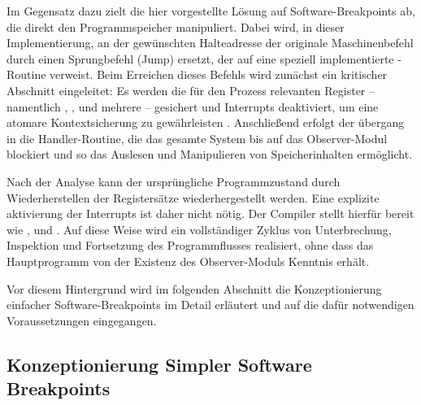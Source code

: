 Im Gegensatz dazu zielt die hier vorgestellte L\"osung auf Software-Breakpoints ab, die direkt den Programmspeicher manipuliert. Dabei wird, in dieser Implementierung, an der gew\"unschten Halteadresse der originale Maschinenbefehl durch einen Sprungbefehl (Jump) ersetzt, der auf eine speziell implementierte -Routine verweist. Beim Erreichen dieses Befehls wird zun\"achst ein kritischer Abschnitt eingeleitet: Es werden die f\"ur den Prozess relevanten Register – namentlich , ,  und \ggf mehrere  – gesichert und Interrupts deaktiviert, um eine atomare Kontextsicherung zu gew\"ahrleisten . Anschlie{\ss}end erfolgt der \"ubergang in die Handler-Routine, die das gesamte System bis auf das Observer-Modul blockiert und so das Auslesen und Manipulieren von Speicherinhalten erm\"oglicht.

Nach der Analyse kann der urspr\"ungliche Programmzustand durch Wiederherstellen der Registers\"atze wiederhergestellt werden. Eine explizite aktivierung der Interrupts ist daher nicht n\"otig. Der Compiler stellt hierf\"ur  bereit wie ,  und  . Auf diese Weise wird ein vollst\"andiger Zyklus von Unterbrechung, Inspektion und Fortsetzung des Programmflusses realisiert, ohne dass das Hauptprogramm von der Existenz des Observer-Moduls Kenntnis erh\"alt.

Vor diesem Hintergrund wird im folgenden Abschnitt die Konzeptionierung einfacher Software-Breakpoints im Detail erl\"autert und auf die daf\"ur notwendigen Voraussetzungen eingegangen.

\subsection{Konzeptionierung Simpler Software Breakpoints}
\label{sec:KonzeptionierungSoftwareBreakpoints}

